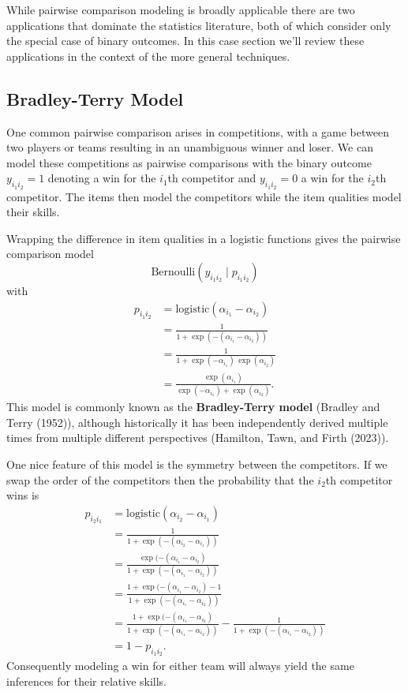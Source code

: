 \documentclass[
  letterpaper,
  DIV=11,
  numbers=noendperiod]{scrartcl}
\begin{document}
While pairwise comparison modeling is broadly applicable there are two
applications that dominate the statistics literature, both of which
consider only the special case of binary outcomes. In this case section
we'll review these applications in the context of the more general
techniques.

\subsection{Bradley-Terry Model}\label{bradley-terry-model}

One common pairwise comparison arises in competitions, with a game
between two players or teams resulting in an unambiguous winner and
loser. We can model these competitions as pairwise comparisons with the
binary outcome \(y_{i_{1} i_{2}} = 1\) denoting a win for the
\(i_{1}\)th competitor and \(y_{i_{1} i_{2}} = 0\) a win for the
\(i_{2}\)th competitor. The items then model the competitors while the
item qualities model their skills.

Wrapping the difference in item qualities in a logistic functions gives
the pairwise comparison model \[
\text{Bernoulli}(y_{i_{1} i_{2}} \mid p_{i_{1} i_{2}})
\] with \begin{align*}
p_{i_{1} i_{2}}
&=
\mathrm{logistic}(\alpha_{i_{1}} - \alpha_{i_{2}})
\\
&=
\frac{1}{1 + \exp( -( \alpha_{i_{1}} - \alpha_{i_{2}} ) )}
\\
&=
\frac{1}{1 + \exp(-\alpha_{i_{1}}) \, \exp(\alpha_{i_{2}})}
\\
&=
\frac{\exp(\alpha_{i_{1}})}
{\exp(-\alpha_{i_{1}}) + \exp(\alpha_{i_{2}})}.
\end{align*} This model is commonly known as the \textbf{Bradley-Terry
model} (Bradley and Terry (1952)), although historically it has been
independently derived multiple times from multiple different
perspectives (Hamilton, Tawn, and Firth (2023)).

One nice feature of this model is the symmetry between the competitors.
If we swap the order of the competitors then the probability that the
\(i_{2}\)th competitor wins is \begin{align*}
p_{i_{2} i_{1}}
&=
\mathrm{logistic}( \alpha_{i_{2}} - \alpha_{i_{1}} )
\\
&=
\frac{1}{1 + \exp( -( \alpha_{i_{2}} - \alpha_{i_{1}} ) )}
\\
&=
\frac
{ \exp( -( \alpha_{i_{1}} - \alpha_{i_{2}} ) }
{ 1 + \exp( -( \alpha_{i_{1}} - \alpha_{i_{2}} ) ) }
\\
&=
\frac
{ 1 + \exp( -( \alpha_{i_{1}} - \alpha_{i_{2}} ) - 1}
{ 1 + \exp( -( \alpha_{i_{1}} - \alpha_{i_{2}} ) ) }
\\
&=
\frac
{ 1 + \exp( -( \alpha_{i_{1}} - \alpha_{i_{2}} ) }
{ 1 + \exp( -( \alpha_{i_{1}} - \alpha_{i_{2}} ) ) }
-
\frac
{ 1 }
{ 1 + \exp( -( \alpha_{i_{1}} - \alpha_{i_{2}} ) ) }
\\
&=
1 - p_{i_{1} i_{2}}.
\end{align*} Consequently modeling a win for either team will always
yield the same inferences for their relative skills.
\end{document}
